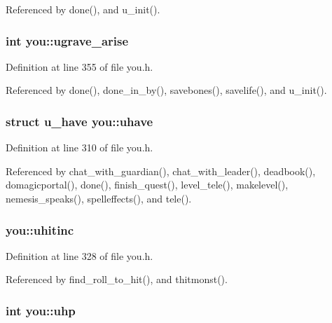 Referenced by done(), and u\+\_\+init().

\hypertarget{structyou_af66a5ecd2d2a4f3443af9cc10fb928f3}{
\subsubsection[{ugrave\+\_\+arise}]{\setlength{\rightskip}{0pt plus 5cm}int you\+::ugrave\+\_\+arise}}\label{structyou_af66a5ecd2d2a4f3443af9cc10fb928f3}


Definition at line 355 of file you.\+h.



Referenced by done(), done\+\_\+in\+\_\+by(), savebones(), savelife(), and u\+\_\+init().

\hypertarget{structyou_a3e83735264e74265e8c8777f73e159fa}{
\subsubsection[{uhave}]{\setlength{\rightskip}{0pt plus 5cm}struct {\bf u\+\_\+have} you\+::uhave}}\label{structyou_a3e83735264e74265e8c8777f73e159fa}


Definition at line 310 of file you.\+h.



Referenced by chat\+\_\+with\+\_\+guardian(), chat\+\_\+with\+\_\+leader(), deadbook(), domagicportal(), done(), finish\+\_\+quest(), level\+\_\+tele(), makelevel(), nemesis\+\_\+speaks(), spelleffects(), and tele().

\hypertarget{structyou_a82f605992d46009b99965f3175ee4187}{
\subsubsection[{uhitinc}]{ you\+::uhitinc}}\label{structyou_a82f605992d46009b99965f3175ee4187}


Definition at line 328 of file you.\+h.



Referenced by find\+\_\+roll\+\_\+to\+\_\+hit(), and thitmonst().

\hypertarget{structyou_a94468a400f14da123d5160f8eefd7641}{
\subsubsection[{uhp}]{\setlength{\rightskip}{0pt plus 5cm}int you\+::uhp}}\label{structyou_a94468a400f14da123d5160f8eefd7641}


